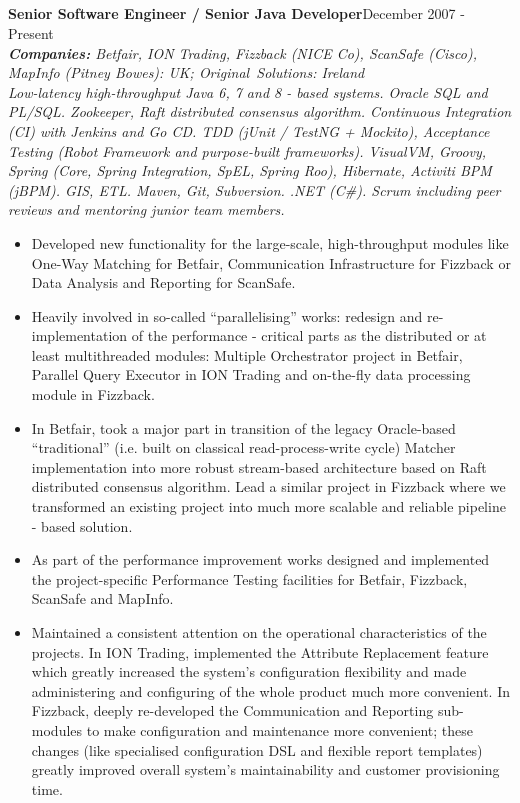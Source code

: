 \documentclass{res}
\newcommand{\aggjobdes}[4]{\needspace{3\baselineskip} %
{\noindent \bf #1\hspace{2ex}}{\hfill #2}\\
{{\noindent \small \textit{ \textbf{ Companies:} {\hfill #3}}}}\\{{\it \small #4.}}}
\newcommand{\osection}[1]{\section{\sc {\Large \textbf{#1}\\}} \vspace{0.30cm}}
\begin{document}
\begin{resume}
\osection{Career History}
\aggjobdes {Senior Software Engineer / Senior Java Developer}{December 2007 - Present}
{Betfair, ION Trading, Fizzback (NICE Co), ScanSafe (Cisco), MapInfo (Pitney Bowes): UK; Original~Solutions: Ireland}
{Low-latency high-throughput Java 6, 7 and 8 - based systems. Oracle SQL and PL/SQL. Zookeeper, Raft distributed consensus algorithm. Continuous Integration (CI) with Jenkins and Go CD. TDD (jUnit / TestNG + Mockito), Acceptance Testing (Robot Framework and purpose-built frameworks). VisualVM, Groovy, Spring (Core, Spring Integration, SpEL, Spring Roo), Hibernate, Activiti BPM (jBPM). GIS, ETL. Maven, Git, Subversion. .NET (C\#). Scrum including peer reviews and mentoring junior team members}
\begin{itemize}
 \item Developed new functionality for the large-scale, high-throughput modules like One-Way Matching for Betfair, Communication Infrastructure for Fizzback or Data Analysis and Reporting for ScanSafe.
 \item Heavily involved in so-called ``parallelising'' works: redesign and re-implementation of the performance - critical parts as the distributed or at least multithreaded modules: Multiple Orchestrator project in Betfair, Parallel Query Executor in ION Trading and on-the-fly data processing module in Fizzback.
 \item In Betfair, took a major part in transition of the legacy Oracle-based ``traditional'' (i.e. built on classical read-process-write cycle) Matcher implementation into more robust stream-based architecture based on Raft distributed consensus algorithm. Lead a similar project in Fizzback where we transformed an existing project into much more scalable and reliable pipeline - based solution.
 \item As part of the performance improvement works designed and implemented the project-specific Performance Testing facilities for Betfair, Fizzback, ScanSafe and MapInfo.
 \item Maintained a consistent attention on the operational characteristics of the projects. In ION Trading, implemented the Attribute Replacement feature which greatly increased the system’s configuration flexibility and made administering and configuring of the whole product much more convenient. In Fizzback, deeply re-developed the Communication and Reporting sub-modules to make configuration and maintenance more convenient; these changes (like specialised configuration DSL and flexible report templates) greatly improved overall system's maintainability and customer provisioning time.

\end{itemize}
\end{resume}
\end{document}
